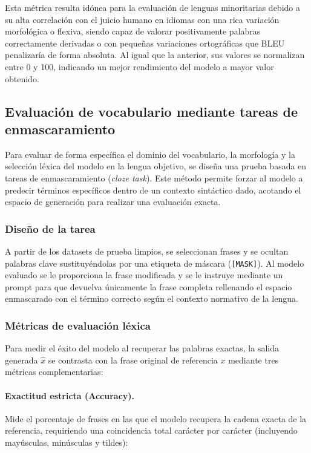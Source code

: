 Esta métrica resulta idónea para la evaluación de lenguas minoritarias debido a su alta correlación con el juicio humano en idiomas con una rica variación morfológica o flexiva, siendo capaz de valorar positivamente palabras correctamente derivadas o con pequeñas variaciones ortográficas que BLEU penalizaría de forma absoluta. Al igual que la anterior, sus valores se normalizan entre 0 y 100, indicando un mejor rendimiento del modelo a mayor valor obtenido.

\subsection{Evaluación de vocabulario mediante tareas de enmascaramiento}
\label{evaluacion-vocabulario}

Para evaluar de forma específica el dominio del vocabulario, la morfología y la selección léxica del modelo en la lengua objetivo, se diseña una prueba basada en tareas de enmascaramiento (\emph{cloze task}). Este método permite forzar al modelo a predecir términos específicos dentro de un contexto sintáctico dado, acotando el espacio de generación para realizar una evaluación exacta.

\subsubsection{Diseño de la tarea}

A partir de los datasets de prueba limpios, se seleccionan frases y se ocultan palabras clave sustituyéndolas por una etiqueta de máscara (\texttt{[MASK]}). Al modelo evaluado se le proporciona la frase modificada y se le instruye mediante un prompt para que devuelva únicamente la frase completa rellenando el espacio enmascarado con el término correcto según el contexto normativo de la lengua.

\subsubsection{Métricas de evaluación léxica}

Para medir el éxito del modelo al recuperar las palabras exactas, la salida generada $\hat{x}$ se contrasta con la frase original de referencia $x$ mediante tres métricas complementarias:

\paragraph{Exactitud estricta (Accuracy).} Mide el porcentaje de frases en las que el modelo recupera la cadena exacta de la referencia, requiriendo una coincidencia total carácter por carácter (incluyendo mayúsculas, minúsculas y tildes):

